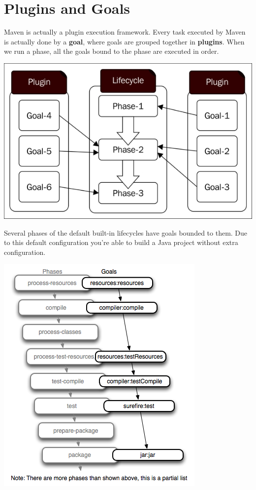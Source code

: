 \section{Plugins and Goals}

Maven is actually a plugin execution framework. Every task executed by Maven is actually done by a \textbf{goal}, where goals are grouped together in \textbf{plugins}.  When we run a phase, all the goals bound to the phase are executed in order.

\includegraphics[width=\textwidth]{./images/chapter3/maven_goals} 

Several phases of the default built-in lifecycles have goals bounded to them.  Due to this default configuration you're able to build a Java project without extra configuration.

\includegraphics[width=\textwidth]{./images/chapter3/maven-lifecycle-binding} 

